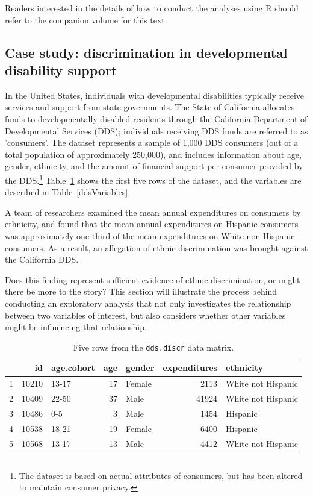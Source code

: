 Readers interested in the details of how to conduct the analyses using \textsf{R} should refer to the companion volume for this text. 

\subsection{Case study: discrimination in developmental disability support}
\label{caseStudyDiscrimination}

In the United States, individuals with developmental disabilities typically receive services and support from state governments. The State of California allocates funds to developmentally-disabled residents through the California Department of Developmental Services (DDS); individuals receiving DDS funds are referred to as 'consumers'. The dataset  represents a sample of 1,000 DDS consumers (out of a total population of approximately 250,000), and includes information about age, gender, ethnicity, and the amount of financial support per consumer provided by the DDS.\footnote{The dataset is based on actual attributes of consumers, but has been altered to maintain consumer privacy.} Table~\ref{ddsDiscrDF} shows the first five rows of the dataset, and the variables are described in Table~\ref{ddsVariables}.

A team of researchers examined the mean annual expenditures on consumers by ethnicity, and found that the mean annual expenditures on Hispanic consumers was approximately one-third of the mean expenditures on White non-Hispanic consumers. As a result, an allegation of ethnic discrimination was brought against the California DDS. 

Does this finding represent sufficient evidence of ethnic discrimination, or might there be more to the story? This section will illustrate the process behind conducting an exploratory analysis that not only investigates the relationship between two variables of interest, but also considers whether other variables might be influencing that relationship.

\begin{table}[ht]
	\centering
	\begin{tabular}{rrlrlrl}
		\hline
		& id & age.cohort & age & gender & expenditures & ethnicity \\ 
		\hline
		1 & 10210 & 13-17 &  17 & Female & 2113 & White not Hispanic \\ 
		2 & 10409 & 22-50 &  37 & Male & 41924 & White not Hispanic \\ 
		3 & 10486 & 0-5 &   3 & Male & 1454 & Hispanic \\ 
		4 & 10538 & 18-21 &  19 & Female & 6400 & Hispanic \\ 
		5 & 10568 & 13-17 &  13 & Male & 4412 & White not Hispanic \\ 
		\hline
	\end{tabular}
	\caption{Five rows from the \texttt{dds.discr} data matrix.} 
	\label{ddsDiscrDF}
\end{table}


